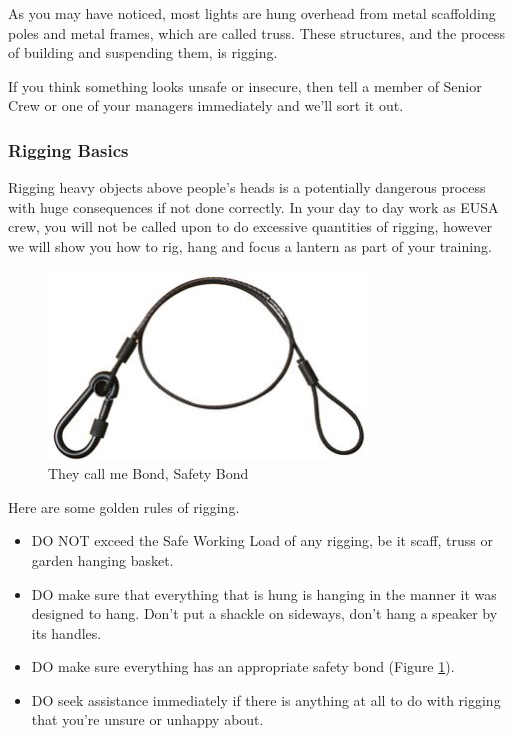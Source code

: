 \documentclass[14pt]{article} %
\begin{document}
As you may have noticed, most lights are hung overhead from metal scaffolding poles and metal frames, which are called truss. These structures, and the process of building and suspending them, is rigging.

If you think something looks unsafe or insecure, then tell a member of Senior Crew or one of your managers immediately and we’ll sort it out.

\subsubsection{Rigging Basics}
Rigging heavy objects above people’s heads is a potentially dangerous process with huge consequences if not done correctly. In your day to day work as EUSA crew, you will not be called upon to do excessive quantities of rigging, however we will show you how to rig, hang and focus a lantern as part of your training. 

\begin{figure}[h]
\begin{center}

\includegraphics[height=5cm]{bond.jpg}
\caption{They call me Bond, Safety Bond}
\label{fig:bond}

\end{center}
\end{figure}

Here are some golden rules of rigging.
\begin{itemize}
\item DO NOT exceed the Safe Working Load of any rigging, be it scaff, truss or garden hanging basket.
\item	DO make sure that everything that is hung is hanging in the manner it was designed to hang. Don’t put a shackle on sideways, don’t hang a speaker by its handles.
\item	DO make sure everything has an appropriate safety bond (Figure \ref{fig:bond}). 
\item	DO seek assistance immediately if there is anything at all to do with rigging that you’re unsure or unhappy about.

\end{itemize}
\end{document}
